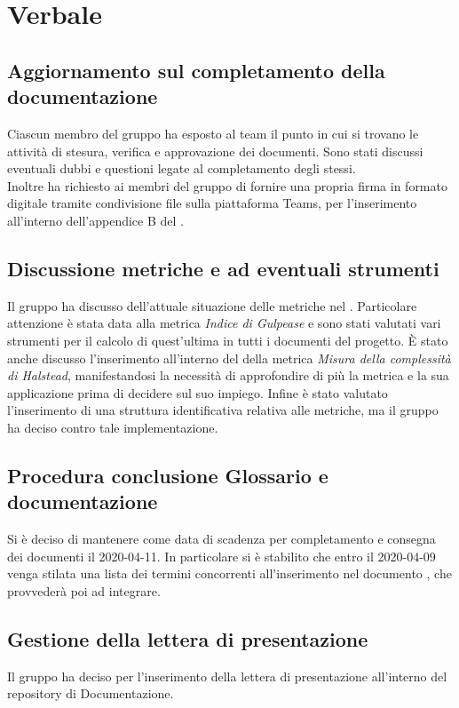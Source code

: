 \section{Verbale}

	\subsection{Aggiornamento sul completamento della documentazione}
	Ciascun membro del gruppo ha esposto al team il punto in cui si trovano le attività di stesura, verifica e approvazione dei documenti. Sono stati discussi eventuali dubbi e questioni legate al completamento degli stessi.\\ Inoltre \VB{} ha richiesto ai membri del gruppo di fornire una propria firma in formato digitale tramite condivisione file sulla piattaforma Teams, per l'inserimento all'interno dell'appendice B del \PdP{}.

	\subsection{Discussione metriche e ad eventuali strumenti}
	Il gruppo ha discusso dell'attuale situazione delle metriche nel \PdQ{}. Particolare attenzione è stata data alla metrica \textit{Indice di Gulpease} e sono stati valutati vari strumenti per il calcolo di quest'ultima in tutti i documenti del progetto. È stato anche discusso l'inserimento all'interno del \PdQ{} della metrica \textit{Misura della complessità di Halstead}, manifestandosi la necessità di approfondire di più la metrica e la sua applicazione prima di decidere sul suo impiego. Infine è stato valutato l'inserimento di una struttura identificativa relativa alle metriche, ma il gruppo ha deciso contro tale implementazione.

	\subsection{Procedura conclusione Glossario e documentazione}
	Si è deciso di mantenere come data di scadenza per completamento e consegna dei documenti il 2020-04-11. In particolare si è stabilito che entro il 2020-04-09 venga stilata una lista dei termini concorrenti all'inserimento nel documento \Glossario{}, che \AS{} provvederà poi ad integrare.

	\subsection{Gestione della lettera di presentazione}
	Il gruppo ha deciso per l'inserimento della lettera di presentazione all'interno del repository di Documentazione.


